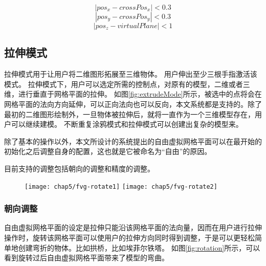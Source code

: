 \begin{equation}
\label{eq:drawPoint}
|pos_x - crossPos_x| < 0.3
\end{equation}
\begin{equation}
\label{eq:drawPoint2}
|pos_y - crossPos_y| < 0.3
\end{equation}
\begin{equation}
\label{eq:drawPoint3}
|pos_z - virtualPlane| < 1
\end{equation}

\subsection{拉伸模式}
\label{sec:extrudeMode}


拉伸模式用于让用户将二维图形拓展至三维物体。
用户伸出至少三根手指激活该模式。
拉伸模式下，用户可以选定所需的控制点，对原有的模型，二维或者三维，进行垂直于网格平面的拉伸。
如图\ref{fig:extrudeMode}所示，被选中的点将会在网格平面的法向方向延伸，可以正向法向也可以反向，本文系统都是支持的。除了最初的二维图形绘制外，一旦物体被拉伸后，就将一直作为一个三维模型存在，用户可以继续建模。
不断重复涂鸦模式和拉伸模式可以创建出复杂的模型来。

除了基本的操作以外，本文所设计的系统提出的自由虚拟网格平面可以在最开始的初始化之后调整自身的配置，这也就是它被命名为“自由”的原因。

目前支持的调整包括朝向的调整和精度的调整。

\begin{figure}[!htp]
  \centering
  \texttt{[image: chap5/fvg-rotate1]}
  \hspace{1em}
  \texttt{[image: chap5/fvg-rotate2]}
\end{figure}

\subsubsection{朝向调整}
自由虚拟网格平面的设定是拉伸只能沿该网格平面的法向量，因而在用户进行拉伸操作时，旋转该网格平面可以使用户的拉伸方向同时得到调整，于是可以更轻松简单地创建弯折的物体。比如拱桥，比如埃菲尔铁塔。
如图\ref{fig:rotation}所示，可以看到旋转过后自由虚拟网格平面带来了模型的弯曲。

